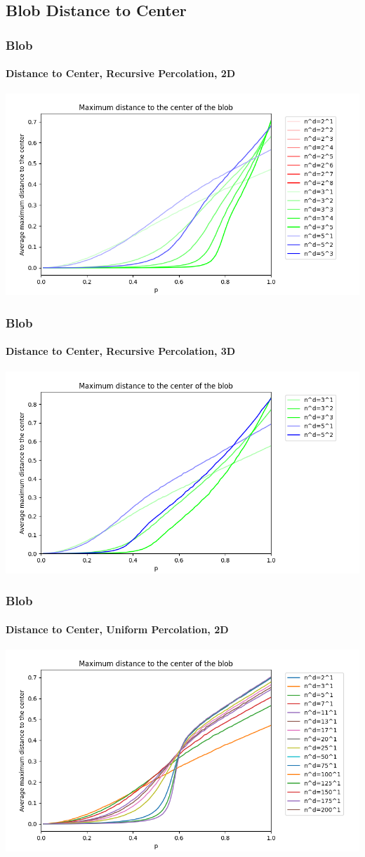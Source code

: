 \documentclass{beamer}
\begin{document}
	\subsection{Blob Distance to Center}
	\begin{frame}
		\frametitle{Blob}
		\framesubtitle{Distance to Center, Recursive Percolation, 2D}
		\includegraphics[scale=0.5]{imgs/blob_dist_2D.png}
	\end{frame}
	\begin{frame}
		\frametitle{Blob}
		\framesubtitle{Distance to Center, Recursive Percolation, 3D}
		\includegraphics[scale=0.5]{imgs/blob_dist_3D.png}
	\end{frame}
	\begin{frame}
		\frametitle{Blob}
		\framesubtitle{Distance to Center, Uniform Percolation, 2D}
		\includegraphics[scale=0.5]{imgs/blob_dist_2D_ter.png}
	\end{frame}
\end{document}
